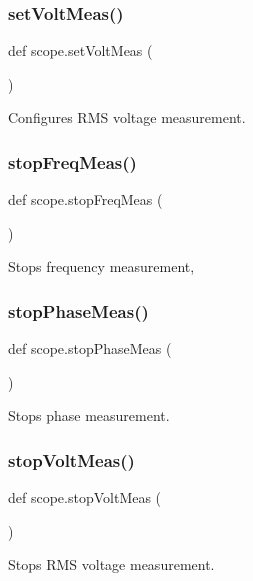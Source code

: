 \subsubsection{\texorpdfstring{set\+Volt\+Meas()}{setVoltMeas()}}
{\footnotesize\ttfamily def scope.\+set\+Volt\+Meas (\begin{DoxyParamCaption}{ }\end{DoxyParamCaption})}

\begin{DoxyVerb}Configures RMS voltage measurement.
\end{DoxyVerb}
 \mbox{\label{namespacescope_a9cd91e246a84ce7762339b534f77cefb}} 
\subsubsection{\texorpdfstring{stop\+Freq\+Meas()}{stopFreqMeas()}}
{\footnotesize\ttfamily def scope.\+stop\+Freq\+Meas (\begin{DoxyParamCaption}{ }\end{DoxyParamCaption})}

\begin{DoxyVerb}Stops frequency measurement,
\end{DoxyVerb}
 \mbox{\label{namespacescope_aa88689aabaecc9e9b66b401a508f876b}} 
\subsubsection{\texorpdfstring{stop\+Phase\+Meas()}{stopPhaseMeas()}}
{\footnotesize\ttfamily def scope.\+stop\+Phase\+Meas (\begin{DoxyParamCaption}{ }\end{DoxyParamCaption})}

\begin{DoxyVerb}Stops phase measurement.
\end{DoxyVerb}
 \mbox{\label{namespacescope_a928d790c87e698f9244e5ed5710bd4cd}} 
\subsubsection{\texorpdfstring{stop\+Volt\+Meas()}{stopVoltMeas()}}
{\footnotesize\ttfamily def scope.\+stop\+Volt\+Meas (\begin{DoxyParamCaption}{ }\end{DoxyParamCaption})}

\begin{DoxyVerb}Stops RMS voltage measurement.
\end{DoxyVerb}
 